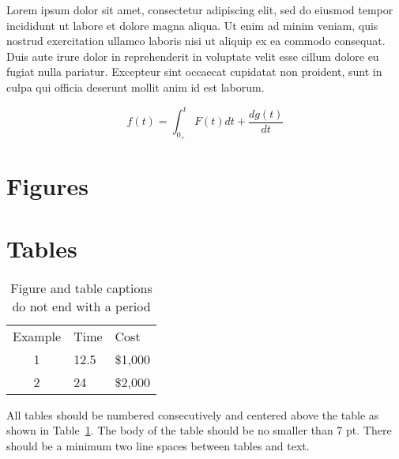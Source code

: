\documentclass[twocolumn,10pt]{asme2ej}
\begin{document}
Lorem ipsum dolor sit amet, consectetur adipiscing elit, sed do eiusmod tempor incididunt ut labore et dolore magna aliqua. Ut enim ad minim veniam, quis nostrud exercitation ullamco laboris nisi ut aliquip ex ea commodo consequat. Duis aute irure dolor in reprehenderit in voluptate velit esse cillum dolore eu fugiat nulla pariatur. Excepteur sint occaecat cupidatat non proident, sunt in culpa qui officia deserunt mollit anim id est laborum.

\begin{equation}
f(t) = \int_{0_+}^t F(t) dt + \frac{d g(t)}{d t}
\label{eq_ASME}
\end{equation}

\section{Figures}
\label{sect_figure}


\section{Tables}

\begin{table}[t]
\caption{Figure and table captions do not end with a period}
\begin{center}
\label{table_ASME}
\begin{tabular}{c l l}
& & \\ %
\hline
Example & Time & Cost \\
\hline
1 & 12.5 & \$1,000 \\
2 & 24 & \$2,000 \\
\hline
\end{tabular}
\end{center}
\end{table}

All tables should be numbered consecutively  and centered above the table as shown in Table~\ref{table_ASME}. The body of the table should be no smaller than 7 pt.  There should be a minimum two line spaces between tables and text.


\end{document}
